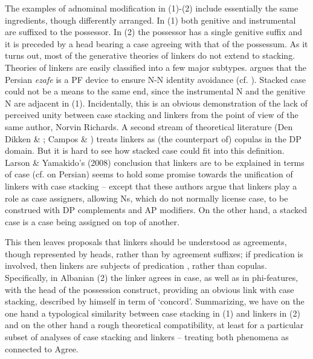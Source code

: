 \documentclass[output=paper]{langsci/langscibook}
\begin{document}
The examples of adnominal modification in (1)-(2) include essentially the same ingredients, though differently arranged. In (1) both genitive and instrumental are suffixed to the possessor. In (2) the possessor has a single genitive suffix and it is preceded by a head bearing a case agreeing with that of the possessum. As it turns out, most of the generative theories of linkers do not extend to stacking. Theories of linkers are easily classified into a few major subtypes. \citet{Richards2010} argues that the Persian \textit{ezafe} is a PF device to ensure N-N identity avoidance (cf. \citealt{Ghomeshi1997}). Stacked case could not be a means to the same end, since the instrumental N and the genitive N are adjacent in (1). Incidentally, this is an obvious demonstration of the lack of perceived unity between case stacking and linkers from the point of view of the same author, Norvin Richards. A second stream of theoretical literature (Den Dikken \& \citealt{Singhapreecha2004}; Campos \& \citealt{Stavrou2005}) treats linkers as (the counterpart of) copulas in the DP domain. But it is hard to see how stacked case could fit into this definition. Larson \& Yamakido’s (2008) conclusion that linkers are to be explained in terms of case (cf. \citealt{Samiian1994} on Persian) seems to hold some promise towards the unification of linkers with case stacking – except that these authors argue that linkers play a role as case assigners, allowing Ns, which do not normally license case, to be construed with DP complements and AP modifiers. On the other hand, a stacked case is a case being assigned on top of another. 

This then leaves proposals \citep{Philip2012} that linkers should be understood as agreements, though represented by heads, rather than by agreement suffixes; if predication is involved, then linkers are subjects of predication \citep{FrancoEtAl2015}, rather than copulas. Specifically, in Albanian (2) the linker agrees in case, as well as in phi-features, with the head of the possession construct, providing an obvious link with case stacking, described by \citet{Richards2013} himself in term of ‘concord’. Summarizing, we have on the one hand a typological similarity between case stacking in (1) and linkers in (2) and on the other hand a rough theoretical compatibility, at least for a particular subset of analyses of case stacking and linkers – treating both phenomena as connected to Agree. 
\end{document}
